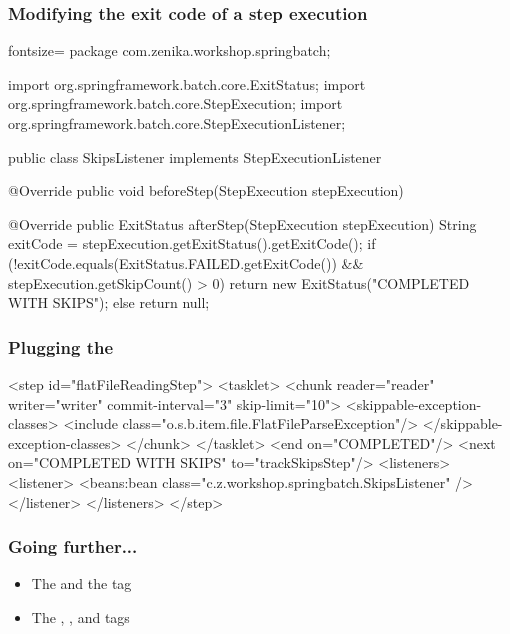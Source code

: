\begin{frame}[fragile]
 \frametitle{Modifying the exit code of a step execution}
 \begin{javacode*}{fontsize=\tiny}
package com.zenika.workshop.springbatch;

import org.springframework.batch.core.ExitStatus;
import org.springframework.batch.core.StepExecution;
import org.springframework.batch.core.StepExecutionListener;

public class SkipsListener implements StepExecutionListener {

  @Override
  public void beforeStep(StepExecution stepExecution) { }

  @Override
  public ExitStatus afterStep(StepExecution stepExecution) {
    String exitCode = stepExecution.getExitStatus().getExitCode();
    if (!exitCode.equals(ExitStatus.FAILED.getExitCode()) && 
              stepExecution.getSkipCount() > 0) {
      return new ExitStatus("COMPLETED WITH SKIPS");
    } else {
      return null;
    }
  }
}
\end{javacode*}

\end{frame}


\begin{frame}[fragile]
 \frametitle{Plugging the }

\begin{xmlcode}
<step id="flatFileReadingStep">
  <tasklet>
    <chunk reader="reader" writer="writer" 
           commit-interval="3" skip-limit="10">
      <skippable-exception-classes>
        <include 
        class="o.s.b.item.file.FlatFileParseException"/>
      </skippable-exception-classes>
    </chunk>
  </tasklet>		
  <end on="COMPLETED"/>	
    <next on="COMPLETED WITH SKIPS" to="trackSkipsStep"/>
  <listeners>
    <listener>
      <beans:bean class="c.z.workshop.springbatch.SkipsListener" />
    </listener>
  </listeners>
</step>
\end{xmlcode}

\end{frame}

\begin{frame}
 \frametitle{Going further...}
 \begin{itemize}
  \item The  and the  tag
  \item The , , and  tags
 \end{itemize}
\end{frame}
